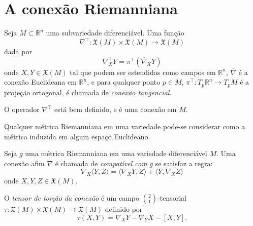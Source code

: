 \section{A conexão Riemanniana}

\begin{definicao}
	Seja $M \subset \mathbb{R}^n$ uma subvariedade diferenciável. Uma função
	\begin{equation*}
		\nabla^\top: \mathfrak{X}(M) \times \mathfrak{X}(M) \rightarrow \mathfrak{X}(M)
	\end{equation*}
	dada por
	\begin{equation*}
		\nabla^\top_X Y = \pi^\top \left( \overline{\nabla}_X Y \right)
	\end{equation*}
	onde $X,Y \in \mathfrak{X}(M)$ tal que podem ser estendidas como campos em $\mathbb{R}^n$, $\overline{\nabla}$ é a conexão Euclideana em $\mathbb{R}^n$, e para qualquer ponto $p \in M$, $\pi^\top: T_p \mathbb{R}^n \rightarrow T_p M$ é a projeção ortogonal, é chamada de \emph{conexão tangencial}.
\end{definicao}

\begin{lema}
	O operador $\nabla^\top$ está bem definido, e é uma conexão em $M$.
\end{lema}

\begin{teorema}
	Qualquer métrica Riemanniana em uma variedade pode-se considerar como a métrica induzida em algum espaço Euclideano.
\end{teorema}

\begin{definicao}
	Seja $g$ uma métrica Riemanniana em uma variedade diferenciável $M$. Uma conexão afim $\nabla$ é chamada de \emph{compatível com} $g$ se satisfaz a regra:
	\begin{equation*}
		\nabla_X \langle Y,Z \rangle = \langle \nabla_X Y, Z \rangle + \langle Y, \nabla_X Z \rangle
	\end{equation*}
	onde $X,Y,Z \in \mathfrak{X}(M)$.
\end{definicao}

\begin{definicao}
	O \emph{tensor de torção da conexão} é um campo $ \binom{2}{1} $-tensorial $\tau: \mathfrak{X}(M) \times \mathfrak{X}(M) \rightarrow \mathfrak{X}(M)$ definido por
	\begin{equation*}
		\tau(X,Y) = \nabla_X Y - \nabla_Y X - [X,Y].
	\end{equation*}
\end{definicao}


